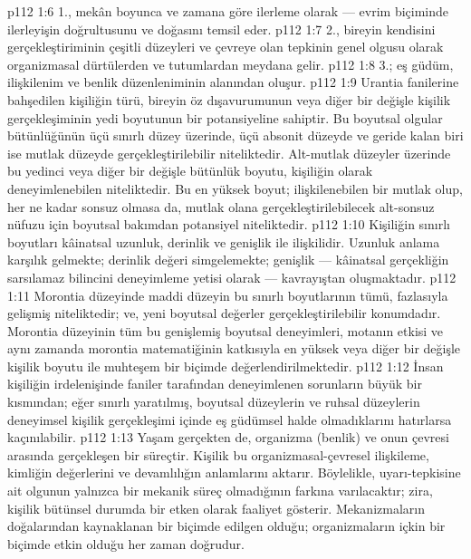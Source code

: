 \vs p112 1:6 1.\bibnobreakspace {}, mekân boyunca ve zamana göre ilerleme olarak --- evrim biçiminde ilerleyişin doğrultusunu ve doğasını temsil eder.
\vs p112 1:7 2.\bibnobreakspace {}, bireyin kendisini gerçekleştiriminin çeşitli düzeyleri ve çevreye olan tepkinin genel olgusu olarak organizmasal dürtülerden ve tutumlardan meydana gelir.
\vs p112 1:8 3.\bibnobreakspace {}; eş güdüm, ilişkilenim ve benlik düzenleniminin alanından oluşur.
\vs p112 1:9 Urantia fanilerine bahşedilen kişiliğin türü, bireyin öz dışavurumunun veya diğer bir değişle kişilik gerçekleşiminin yedi boyutunun bir potansiyeline sahiptir. Bu boyutsal olgular bütünlüğünün üçü sınırlı düzey üzerinde, üçü absonit düzeyde ve geride kalan biri ise mutlak düzeyde gerçekleştirilebilir niteliktedir. Alt\hyp{}mutlak düzeyler üzerinde bu yedinci veya diğer bir değişle bütünlük boyutu, kişiliğin  olarak deneyimlenebilen niteliktedir. Bu en yüksek boyut; ilişkilenebilen bir mutlak olup, her ne kadar sonsuz olmasa da, mutlak olana gerçekleştirilebilecek alt\hyp{}sonsuz nüfuzu için boyutsal bakımdan potansiyel niteliktedir.
\vs p112 1:10 Kişiliğin sınırlı boyutları kâinatsal uzunluk, derinlik ve genişlik ile ilişkilidir. Uzunluk anlama karşılık gelmekte; derinlik değeri simgelemekte; genişlik --- kâinatsal gerçekliğin sarsılamaz bilincini deneyimleme yetisi olarak --- kavrayıştan oluşmaktadır.
\vs p112 1:11 Morontia düzeyinde maddi düzeyin bu sınırlı boyutlarının tümü, fazlasıyla gelişmiş niteliktedir; ve, yeni boyutsal değerler gerçekleştirilebilir konumdadır. Morontia düzeyinin tüm bu genişlemiş boyutsal deneyimleri, motanın etkisi ve aynı zamanda morontia matematiğinin katkısıyla en yüksek veya diğer bir değişle kişilik boyutu ile muhteşem bir biçimde değerlendirilmektedir.
\vs p112 1:12 İnsan kişiliğin irdelenişinde faniler tarafından deneyimlenen sorunların büyük bir kısmından; eğer sınırlı yaratılmış, boyutsal düzeylerin ve ruhsal düzeylerin deneyimsel kişilik gerçekleşimi içinde eş güdümsel halde olmadıklarını hatırlarsa kaçınılabilir.
\vs p112 1:13 Yaşam gerçekten de, organizma (benlik) ve onun çevresi arasında gerçekleşen bir süreçtir. Kişilik bu organizmasal\hyp{}çevresel ilişkileme, kimliğin değerlerini ve devamlılığın anlamlarını aktarır. Böylelikle, uyarı\hyp{}tepkisine ait olgunun yalnızca bir mekanik süreç olmadığının farkına varılacaktır; zira, kişilik bütünsel durumda bir etken olarak faaliyet gösterir. Mekanizmaların doğalarından kaynaklanan bir biçimde edilgen olduğu; organizmaların içkin bir biçimde etkin olduğu her zaman doğrudur.
